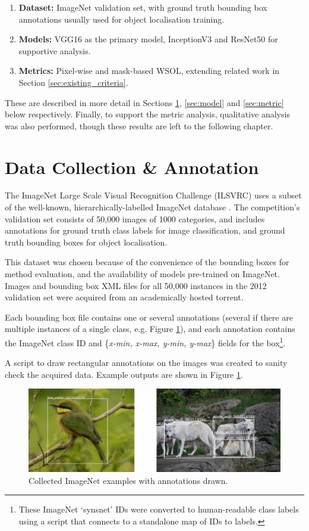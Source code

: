\documentclass[main]{subfiles}
\begin{document}
\begin{enumerate}
\item \textbf{Dataset:} ImageNet validation set, with ground truth bounding box annotations usually used for object localisation training. 
\item \textbf{Models:} VGG16 as the primary model, InceptionV3 and ResNet50 for supportive analysis.
\item \textbf{Metrics:} Pixel-wise and mask-based WSOL, extending related work in Section \ref{sec:existing_criteria}.
\end{enumerate}

These are described in more detail in Sections \ref{sec:data}, \ref{sec:model} and \ref{sec:metric} below respectively. Finally, to support the metric analysis, qualitative analysis was also performed, though these results are left to the following chapter.


\section{Data Collection \& Annotation} \label{sec:data}

The ImageNet Large Scale Visual Recognition Challenge (ILSVRC) uses a subset of the well-known, hierarchically-labelled ImageNet database \cite{ilsvrc}. The competition's validation set consists of 50,000 images of 1000 categories, and includes annotations for ground truth class labels for image classification, and ground truth bounding boxes for object localisation.

This dataset was chosen because of the convenience of the bounding boxes for method evaluation, and the availability of models pre-trained on ImageNet. Images and bounding box XML files for all 50,000 instances in the 2012 validation set were acquired from an academically hosted torrent.

Each bounding box file contains one or several annotations (several if there are multiple instances of a single class, e.g. Figure \ref{dataimg}), and each annotation contains the ImageNet class ID and \{\textit{x-min, x-max, y-min, y-max}\} fields for the box\footnote{These ImageNet `synsnet' IDs were converted to human-readable class labels using a script that connects to a standalone map of IDs to labels.}.

A script to draw rectangular annotations on the images was created to sanity check the acquired data. Example outputs are shown in Figure \ref{dataimg}.

\begin{figure}[h]
\centering
\includegraphics[scale=0.45]{annotation.png}
\caption{Collected ImageNet examples with annotations drawn.}
\label{dataimg}
\end{figure}
\end{document}
